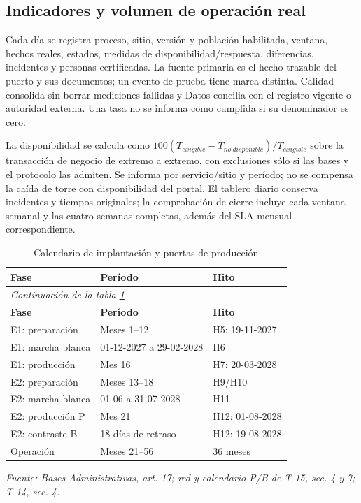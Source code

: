 \subsection{Indicadores y volumen de operación real}
Cada día se registra proceso, sitio, versión y población habilitada, ventana, hechos reales, estados, medidas de disponibilidad/respuesta, diferencias, incidentes y personas certificadas. La fuente primaria es el hecho trazable del puerto y sus documentos; un evento de prueba tiene marca distinta. Calidad consolida sin borrar mediciones fallidas y Datos concilia con el registro vigente o autoridad externa. Una tasa no se informa como cumplida si su denominador es cero.

La disponibilidad se calcula como $100(T_{exigible}-T_{no\ disponible})/T_{exigible}$ sobre la transacción de negocio de extremo a extremo, con exclusiones sólo si las bases y el protocolo las admiten. Se informa por servicio/sitio y período; no se compensa la caída de torre con disponibilidad del portal. El tablero diario conserva incidentes y tiempos originales; la comprobación de cierre incluye cada ventana semanal y las cuatro semanas completas, además del SLA mensual correspondiente.

\begingroup\small\setlength{\tabcolsep}{3pt}
\begin{longtable}{p{}p{}p{}}
\caption{Calendario de implantación y puertas de producción}\label{tab:t18-fases}\\\hline
\textbf{Fase} & \textbf{Período} & \textbf{Hito}\\\hline\endfirsthead
\multicolumn{3}{l}{\textit{Continuación de la tabla \ref{tab:t18-fases}}}\\\hline
\textbf{Fase} & \textbf{Período} & \textbf{Hito}\\\hline\endhead
\hline\endfoot\hline\endlastfoot
E1: preparación & Meses 1--12 & H5: 19-11-2027\\\hline
E1: marcha blanca & 01-12-2027 a 29-02-2028 & H6\\\hline
E1: producción & Mes 16 & H7: 20-03-2028\\\hline
E2: preparación & Meses 13--18 & H9/H10\\\hline
E2: marcha blanca & 01-06 a 31-07-2028 & H11\\\hline
E2: producción P & Mes 21 & H12: 01-08-2028\\\hline
E2: contraste B & 18 días de retraso & H12: 19-08-2028\\\hline
Operación & Meses 21--56 & 36 meses\\\hline
\end{longtable}\endgroup
\noindent\textit{Fuente: Bases Administrativas, art. 17; red y calendario P/B de T-15, sec. 4 y 7; T-14, sec. 4.}

